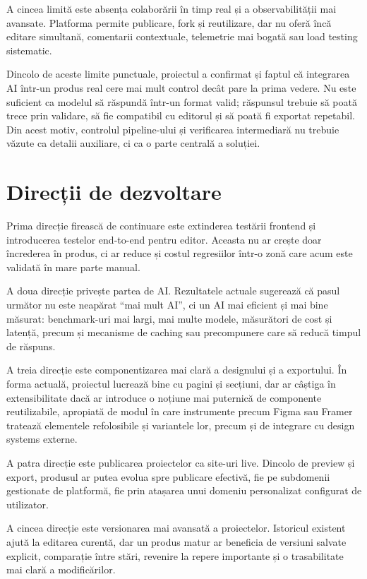 A cincea limită este absența colaborării în timp real și a observabilității mai avansate. Platforma permite publicare, fork și reutilizare, dar nu oferă încă editare simultană, comentarii contextuale, telemetrie mai bogată sau load testing sistematic.

Dincolo de aceste limite punctuale, proiectul a confirmat și faptul că integrarea AI într-un produs real cere mai mult control decât pare la prima vedere. Nu este suficient ca modelul să răspundă într-un format valid; răspunsul trebuie să poată trece prin validare, să fie compatibil cu editorul și să poată fi exportat repetabil. Din acest motiv, controlul pipeline-ului și verificarea intermediară nu trebuie văzute ca detalii auxiliare, ci ca o parte centrală a soluției.

\section{Direcții de dezvoltare}

Prima direcție firească de continuare este extinderea testării frontend și introducerea testelor end-to-end pentru editor. Aceasta nu ar crește doar încrederea în produs, ci ar reduce și costul regresiilor într-o zonă care acum este validată în mare parte manual.

A doua direcție privește partea de AI. Rezultatele actuale sugerează că pasul următor nu este neapărat ``mai mult AI'', ci un AI mai eficient și mai bine măsurat: benchmark-uri mai largi, mai multe modele, măsurători de cost și latență, precum și mecanisme de caching sau precompunere care să reducă timpul de răspuns.

A treia direcție este componentizarea mai clară a designului și a exportului. În forma actuală, proiectul lucrează bine cu pagini și secțiuni, dar ar câștiga în extensibilitate dacă ar introduce o noțiune mai puternică de componente reutilizabile, apropiată de modul în care instrumente precum Figma sau Framer tratează elementele refolosibile și variantele lor, precum și de integrare cu design systems externe.

A patra direcție este publicarea proiectelor ca site-uri live. Dincolo de preview și export, produsul ar putea evolua spre publicare efectivă, fie pe subdomenii gestionate de platformă, fie prin atașarea unui domeniu personalizat configurat de utilizator.

A cincea direcție este versionarea mai avansată a proiectelor. Istoricul existent ajută la editarea curentă, dar un produs matur ar beneficia de versiuni salvate explicit, comparație între stări, revenire la repere importante și o trasabilitate mai clară a modificărilor.

